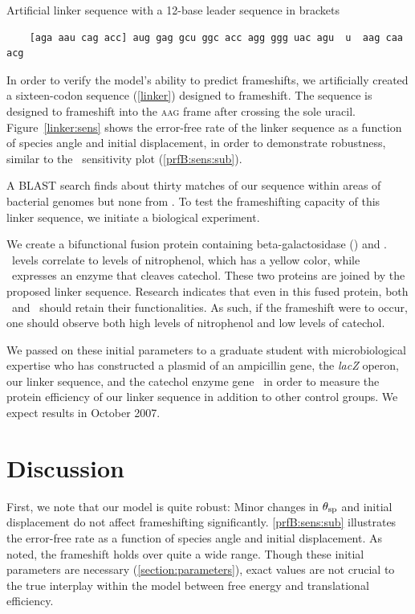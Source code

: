 \documentclass[12pt]{article}
\numberwithin{equation}{section}
\begin{document}
\begin{cfigure}
  \caption{Artificial linker sequence with a 12-base leader sequence
    in brackets}
  \label{linker}
  \begin{verbatim}
    [aga aau cag acc] aug gag gcu ggc acc agg ggg uac agu  u  aag caa acg
  \end{verbatim}
\end{cfigure}

In order to verify the model's ability to predict frameshifts, we
artificially created a sixteen-codon sequence (\autoref{linker})
designed to frameshift.  The sequence is designed to frameshift into
the \textsc{aag} frame after crossing the sole uracil.  Figure~\ref{linker:sens}
shows the error-free rate of the linker sequence as a function of species
angle and initial displacement, in order to demonstrate robustness,
similar to the \prfB\ sensitivity plot (\autoref{prfB:sens:sub}).

A BLAST search finds about thirty matches of our sequence within areas of
bacterial genomes but none from \ecoli. To test the frameshifting capacity of
this linker sequence, we initiate a biological experiment.

We create a bifunctional fusion protein containing beta-galactosidase (\bgals) 
and \xylE. \bgals\ levels correlate to
levels of nitrophenol, which has a yellow color, while \xylE\ expresses
an enzyme that cleaves catechol.  These two proteins are joined by
the proposed linker sequence.  Research indicates that even in this
fused protein, both \bgals\ and \xylE\ should retain their functionalities.
As such, if the frameshift were to occur, one should observe both 
high levels of nitrophenol and low levels of catechol.

We passed on these initial parameters to a graduate student with
microbiological expertise who has constructed a plasmid of an
ampicillin gene, the \emph{lacZ} operon, our linker sequence, and the
catechol enzyme gene \xylE\ in order to measure the protein
efficiency of our linker sequence in addition to other control
groups. We expect results in October 2007.

\section{Discussion}
\label{section:discussion}

First, we note that our model is quite robust: Minor changes
in $\theta_{\rm{sp}}$ and initial displacement do not affect
frameshifting significantly.
\autoref{prfB:sens:sub} illustrates the error-free rate as
a function of species angle and initial displacement. As noted,
the frameshift holds over quite a wide range. Though these initial
parameters are necessary (\autoref{section:parameters}), exact values
are not
crucial to the true interplay within the model between free energy and
translational efficiency.
\end{document}
